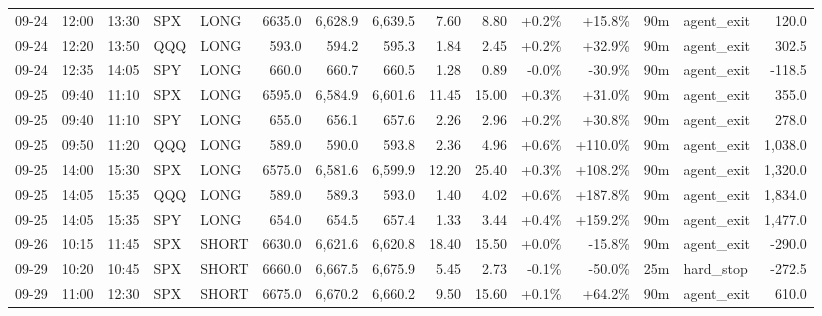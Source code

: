 \documentclass[11pt,a4paper,twoside]{article}
\begin{document}
\begin{landscape}
\begin{center}
\begin{longtable}{>{\color{txtmain}}l l l l l r r r r r r r r >{\color{txtmain}}l r}
09-24 & 12:00 & 13:30 & SPX & LONG & 6635.0 & 6,628.9 & 6,639.5 & 7.60 & 8.80 & \textcolor{wingreen}{+0.2\%} & \textcolor{wingreen}{+15.8\%} & 90m & agent\_exit & \textcolor{wingreen}{120.0} \\
09-24 & 12:20 & 13:50 & QQQ & LONG & 593.0 & 594.2 & 595.3 & 1.84 & 2.45 & \textcolor{wingreen}{+0.2\%} & \textcolor{wingreen}{+32.9\%} & 90m & agent\_exit & \textcolor{wingreen}{302.5} \\
09-24 & 12:35 & 14:05 & SPY & LONG & 660.0 & 660.7 & 660.5 & 1.28 & 0.89 & \textcolor{lossred}{-0.0\%} & \textcolor{lossred}{-30.9\%} & 90m & agent\_exit & \textcolor{lossred}{-118.5} \\
09-25 & 09:40 & 11:10 & SPX & LONG & 6595.0 & 6,584.9 & 6,601.6 & 11.45 & 15.00 & \textcolor{wingreen}{+0.3\%} & \textcolor{wingreen}{+31.0\%} & 90m & agent\_exit & \textcolor{wingreen}{355.0} \\
09-25 & 09:40 & 11:10 & SPY & LONG & 655.0 & 656.1 & 657.6 & 2.26 & 2.96 & \textcolor{wingreen}{+0.2\%} & \textcolor{wingreen}{+30.8\%} & 90m & agent\_exit & \textcolor{wingreen}{278.0} \\
09-25 & 09:50 & 11:20 & QQQ & LONG & 589.0 & 590.0 & 593.8 & 2.36 & 4.96 & \textcolor{wingreen}{+0.6\%} & \textcolor{wingreen}{+110.0\%} & 90m & agent\_exit & \textcolor{wingreen}{1,038.0} \\
09-25 & 14:00 & 15:30 & SPX & LONG & 6575.0 & 6,581.6 & 6,599.9 & 12.20 & 25.40 & \textcolor{wingreen}{+0.3\%} & \textcolor{wingreen}{+108.2\%} & 90m & agent\_exit & \textcolor{wingreen}{1,320.0} \\
09-25 & 14:05 & 15:35 & QQQ & LONG & 589.0 & 589.3 & 593.0 & 1.40 & 4.02 & \textcolor{wingreen}{+0.6\%} & \textcolor{wingreen}{+187.8\%} & 90m & agent\_exit & \textcolor{wingreen}{1,834.0} \\
09-25 & 14:05 & 15:35 & SPY & LONG & 654.0 & 654.5 & 657.4 & 1.33 & 3.44 & \textcolor{wingreen}{+0.4\%} & \textcolor{wingreen}{+159.2\%} & 90m & agent\_exit & \textcolor{wingreen}{1,477.0} \\
09-26 & 10:15 & 11:45 & SPX & SHORT & 6630.0 & 6,621.6 & 6,620.8 & 18.40 & 15.50 & \textcolor{wingreen}{+0.0\%} & \textcolor{lossred}{-15.8\%} & 90m & agent\_exit & \textcolor{lossred}{-290.0} \\
09-29 & 10:20 & 10:45 & SPX & SHORT & 6660.0 & 6,667.5 & 6,675.9 & 5.45 & 2.73 & \textcolor{lossred}{-0.1\%} & \textcolor{lossred}{-50.0\%} & 25m & hard\_stop & \textcolor{lossred}{-272.5} \\
09-29 & 11:00 & 12:30 & SPX & SHORT & 6675.0 & 6,670.2 & 6,660.2 & 9.50 & 15.60 & \textcolor{wingreen}{+0.1\%} & \textcolor{wingreen}{+64.2\%} & 90m & agent\_exit & \textcolor{wingreen}{610.0} \\

\end{longtable}
\end{center}
\end{landscape}
\end{document}
